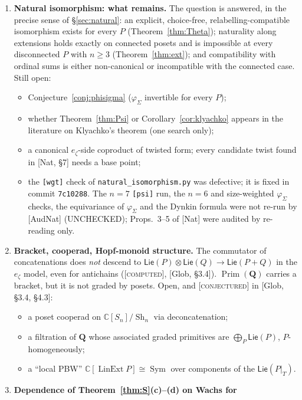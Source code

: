 \documentclass[11pt]{article}
\theoremstyle{definition}
\theoremstyle{remark}
\newcommand{\Lin}{\operatorname{LinExt}}
\newcommand{\PLie}{\mathsf{Lie}}
\newcommand{\Sh}{\operatorname{Sh}}
\newcommand{\st}[1]{\textup{[\textsc{#1}]}}
\newcommand{\src}[1]{\nolinkurl{#1}}
\begin{document}
\begin{enumerate}
\item \textbf{Natural isomorphism: what remains.} The question is answered,
  in the precise sense of \S\ref{sec:natural}: an explicit, choice-free,
  relabelling-compatible isomorphism exists for every $P$
  (Theorem~\ref{thm:Theta}); naturality along extensions holds exactly on
  connected posets and is impossible at every disconnected $P$ with $n\ge3$
  (Theorem~\ref{thm:ext}); and compatibility with ordinal sums is either
  non-canonical or incompatible with the connected case. Still open:
  \begin{itemize}[nosep]
  \item Conjecture~\ref{conj:phisigma} ($\varphi_\Sigma$ invertible for
    every $P$);
  \item whether Theorem~\ref{thm:Psi} or Corollary~\ref{cor:klyachko}
    appears in the literature on Klyachko's theorem (one search only);
  \item a canonical $e_\zeta$-side coproduct of twisted form; every
    candidate twist found in [Nat, \S7] needs a base point;
  \item the \texttt{[wgt]} check of \src{natural_isomorphism.py} was
    defective; it is fixed in commit \texttt{7c10288}. The $n=7$ \texttt{[psi]} run, the
    $n=6$ and size-weighted $\varphi_\Sigma$ checks, the equivariance of
    $\varphi_\Sigma$ and the Dynkin formula were not re-run by [AudNat]
    (UNCHECKED); Props.~3--5 of [Nat] were audited by re-reading only.
  \end{itemize}
\item \textbf{Bracket, cooperad, Hopf-monoid structure.} The commutator of
  concatenations does \emph{not} descend to
  $\PLie(P)\otimes\PLie(Q)\to\PLie(P+Q)$ in the $e_\zeta$ model, even for
  antichains (\st{computed}, [Glob, \S3.4]). $\operatorname{Prim}(\mathbf Q)$
  carries a bracket, but it is not graded by posets. Open, and
  \st{conjectured} in [Glob, \S3.4, \S4.3]:
  \begin{itemize}[nosep]
  \item a poset cooperad on $\mathbb C[S_n]/\Sh_n$ via deconcatenation;
  \item a filtration of $\mathbf Q$ whose associated graded primitives are
    $\bigoplus_P\PLie(P)$, $P$-homogeneously;
  \item a ``local PBW'' $\mathbb C[\Lin P]\cong\operatorname{Sym}$ over
    components of the $\PLie(P|_T)$.
  \end{itemize}
\item \textbf{Dependence of Theorem~\ref{thm:S}(c)--(d) on Wachs for
}
\end{enumerate}
\end{document}
